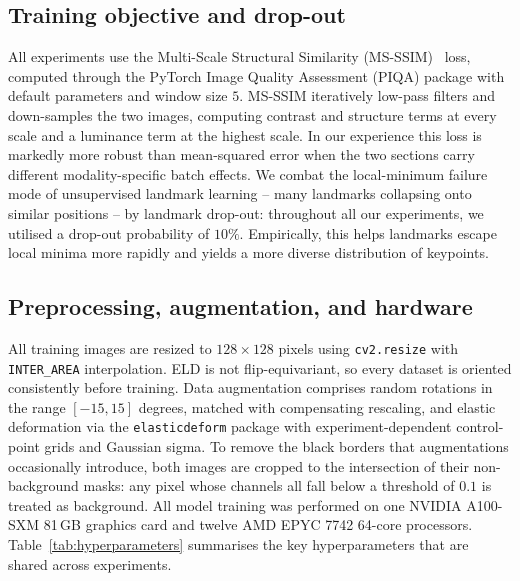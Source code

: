 \documentclass[11pt]{article}
\begin{document}
\subsection{Training objective and drop-out}

All experiments use the Multi-Scale Structural Similarity (MS-SSIM)~\cite{wang2003multiscale,wang2004image} loss, computed through the PyTorch Image Quality Assessment (PIQA) package with default parameters and window size $5$. MS-SSIM iteratively low-pass filters and down-samples the two images, computing contrast and structure terms at every scale and a luminance term at the highest scale. In our experience this loss is markedly more robust than mean-squared error when the two sections carry different modality-specific batch effects. We combat the local-minimum failure mode of unsupervised landmark learning -- many landmarks collapsing onto similar positions -- by landmark drop-out: throughout all our experiments, we utilised a drop-out probability of $10\%$. Empirically, this helps landmarks escape local minima more rapidly and yields a more diverse distribution of keypoints.

\subsection{Preprocessing, augmentation, and hardware}

All training images are resized to $128 \times 128$ pixels using \texttt{cv2.resize} with \texttt{INTER\_AREA} interpolation. ELD is not flip-equivariant, so every dataset is oriented consistently before training. Data augmentation comprises random rotations in the range $[-15, 15]$ degrees, matched with compensating rescaling, and elastic deformation via the \texttt{elasticdeform} package with experiment-dependent control-point grids and Gaussian sigma. To remove the black borders that augmentations occasionally introduce, both images are cropped to the intersection of their non-background masks: any pixel whose channels all fall below a threshold of $0.1$ is treated as background. All model training was performed on one NVIDIA A100-SXM 81\,GB graphics card and twelve AMD EPYC 7742 64-core processors. Table~\ref{tab:hyperparameters} summarises the key hyperparameters that are shared across experiments.
\end{document}
